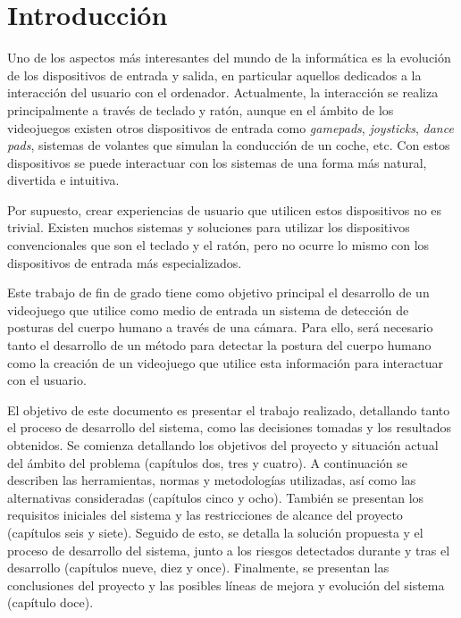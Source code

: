 \chapter{Introducción}
\label{cap:introduccion}
Uno de los aspectos más interesantes del mundo de la informática es la evolución
de los dispositivos de entrada y salida, en particular aquellos dedicados a la
interacción del usuario con el ordenador.  Actualmente, la interacción se
realiza principalmente a través de teclado y ratón, aunque en el ámbito de
los videojuegos existen otros dispositivos de entrada como \textit{gamepads},
\textit{joysticks}, \textit{dance pads}, sistemas de volantes que simulan la
conducción de un coche, etc. Con estos dispositivos se puede interactuar con los
sistemas de una forma más natural, divertida e intuitiva.

Por supuesto, crear experiencias de usuario que utilicen estos dispositivos no
es trivial. Existen muchos sistemas y soluciones para utilizar los dispositivos
convencionales que son el teclado y el ratón, pero no ocurre lo mismo con los
dispositivos de entrada más especializados.

Este trabajo de fin de grado tiene como objetivo principal el desarrollo de un videojuego que
utilice como medio de entrada un sistema de detección de posturas del cuerpo humano a través de una
cámara. Para ello, será necesario tanto el desarrollo de un método para detectar la postura del
cuerpo humano como la creación de un videojuego que utilice esta información para interactuar con el
usuario.

El objetivo de este documento es presentar el trabajo realizado, detallando tanto el proceso de
desarrollo del sistema, como las decisiones tomadas y los resultados obtenidos. Se comienza
detallando los objetivos del proyecto y situación actual del ámbito del problema (capítulos dos,
tres y cuatro). A continuación se describen las herramientas, normas y metodologías utilizadas,
así como las alternativas consideradas (capítulos cinco y ocho). También se presentan los requisitos
iniciales del sistema y las restricciones de alcance del proyecto (capítulos seis y siete). Seguido de
esto,  se detalla la solución propuesta y el proceso de desarrollo del sistema, junto a los riesgos
detectados durante y tras el desarrollo (capítulos nueve, diez y once). Finalmente, se presentan las
conclusiones del proyecto y las posibles líneas de mejora y evolución del sistema (capítulo doce).

